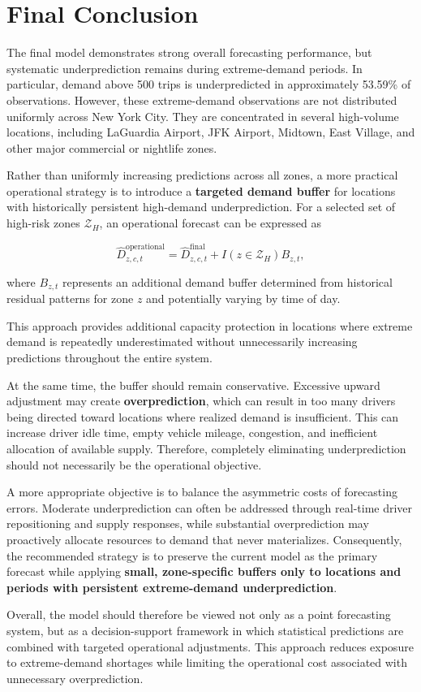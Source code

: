 \documentclass[11pt]{article}
\begin{document}
\section{Final Conclusion}

The final model demonstrates strong overall forecasting performance, but systematic underprediction remains during extreme-demand periods.
 In particular, demand above 500 trips is underpredicted in approximately 53.59\% of observations. However, these extreme-demand observations
  are not distributed uniformly across New York City. They are concentrated in several high-volume locations, including LaGuardia Airport, 
  JFK Airport, Midtown, East Village, and other major commercial or nightlife zones.

Rather than uniformly increasing predictions across all zones, a more practical operational strategy is to introduce a \textbf{targeted demand buffer} for locations with historically persistent high-demand underprediction. 
For a selected set of high-risk zones $\mathcal{Z}_{H}$, an operational forecast can be expressed as

\begin{equation}
\widehat{D}_{z,c,t}^{\mathrm{operational}}
=
\widehat{D}_{z,c,t}^{\mathrm{final}}
+
I(z \in \mathcal{Z}_{H})B_{z,t},
\end{equation}

where $B_{z,t}$ represents an additional demand buffer determined from historical residual patterns for zone $z$ and potentially varying by time of day.

This approach provides additional capacity protection in locations where extreme demand is repeatedly underestimated without unnecessarily increasing predictions throughout the entire system.

At the same time, the buffer should remain conservative. Excessive upward adjustment may create \textbf{overprediction}, which can result in too many drivers being directed toward locations where realized demand is insufficient. This can increase driver idle time, empty vehicle mileage, congestion, and inefficient allocation of available supply. Therefore, completely eliminating underprediction should not necessarily be the operational objective.

A more appropriate objective is to balance the asymmetric costs of forecasting errors. Moderate underprediction can often be addressed through real-time driver repositioning and supply responses, while substantial overprediction may proactively allocate resources to demand that never materializes. Consequently, the recommended strategy is to preserve the current model as the primary forecast while applying \textbf{small, zone-specific buffers only to locations and periods with persistent extreme-demand underprediction}.

Overall, the model should therefore be viewed not only as a point forecasting system, but as a decision-support framework in which statistical predictions are combined with targeted operational adjustments. This approach reduces exposure to extreme-demand shortages while limiting the operational cost associated with unnecessary overprediction.
\end{document}
